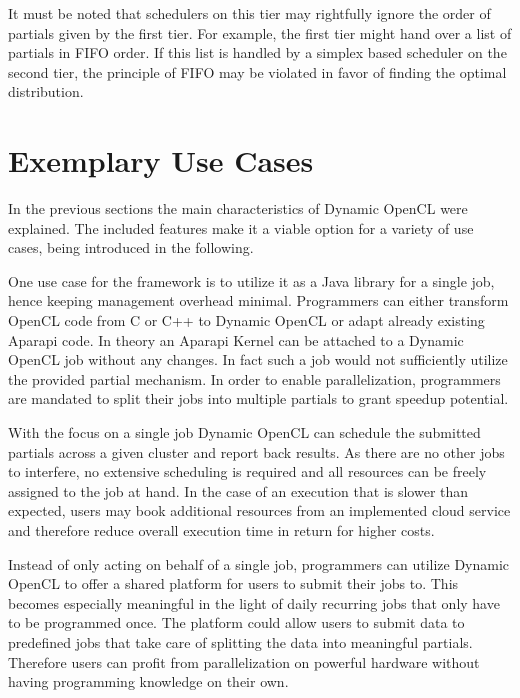 It must be noted that schedulers on this tier may rightfully ignore the order of partials given by the first tier. For example, the first tier might hand over a list of partials in FIFO order. If this list is handled by a simplex based scheduler on the second tier, the principle of FIFO may be violated in favor of finding the optimal distribution.

\section{Exemplary Use Cases}
\label{use_cases}
In the previous sections the main characteristics of Dynamic OpenCL were explained. The included features make it a viable option for a variety of use cases, being introduced in the following.

\begin{description}[style=nextline]
	\item[Job Based Library]
	One use case for the framework is to utilize it as a Java library for a single job, hence keeping management overhead minimal. Programmers can either transform OpenCL code from C or C++ to Dynamic OpenCL or adapt already existing Aparapi code. In theory an Aparapi Kernel can be attached to a Dynamic OpenCL job without any changes. In fact such a job would not sufficiently utilize the provided partial mechanism. In order to enable parallelization, programmers are mandated to split their jobs into multiple partials to grant speedup potential.

	With the focus on a single job Dynamic OpenCL can schedule the submitted partials across a given cluster and report back results. As there are no other jobs to interfere, no extensive scheduling is required and all resources can be freely assigned to the job at hand. In the case of an execution that is slower than expected, users may book additional resources from an implemented cloud service and therefore reduce overall execution time in return for higher costs.

	\item[Local Cluster Provider]

	Instead of only acting on behalf of a single job, programmers can utilize Dynamic OpenCL to offer a shared platform for users to submit their jobs to. This becomes especially meaningful in the light of daily recurring jobs that only have to be programmed once. The platform could allow users to submit data to predefined jobs that take care of splitting the data into meaningful partials. Therefore users can profit from parallelization on powerful hardware without having programming knowledge on their own.


\end{description}
